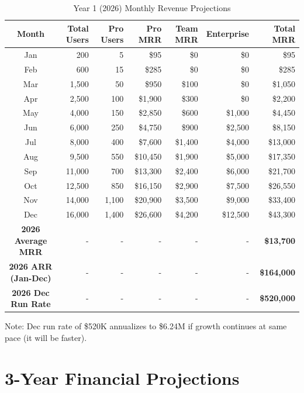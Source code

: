\documentclass{report}
\begin{document}
\begin{table}[h]
\centering
\begin{tabular}{|c|r|r|r|r|r|r|}
\toprule
\textbf{Month} & \textbf{Total Users} & \textbf{Pro Users} & \textbf{Pro MRR} & \textbf{Team MRR} & \textbf{Enterprise} & \textbf{Total MRR} \\
\midrule
Jan & 200 & 5 & \$95 & \$0 & \$0 & \$95 \\
Feb & 600 & 15 & \$285 & \$0 & \$0 & \$285 \\
Mar & 1,500 & 50 & \$950 & \$100 & \$0 & \$1,050 \\
Apr & 2,500 & 100 & \$1,900 & \$300 & \$0 & \$2,200 \\
May & 4,000 & 150 & \$2,850 & \$600 & \$1,000 & \$4,450 \\
Jun & 6,000 & 250 & \$4,750 & \$900 & \$2,500 & \$8,150 \\
Jul & 8,000 & 400 & \$7,600 & \$1,400 & \$4,000 & \$13,000 \\
Aug & 9,500 & 550 & \$10,450 & \$1,900 & \$5,000 & \$17,350 \\
Sep & 11,000 & 700 & \$13,300 & \$2,400 & \$6,000 & \$21,700 \\
Oct & 12,500 & 850 & \$16,150 & \$2,900 & \$7,500 & \$26,550 \\
Nov & 14,000 & 1,100 & \$20,900 & \$3,500 & \$9,000 & \$33,400 \\
Dec & 16,000 & 1,400 & \$26,600 & \$4,200 & \$12,500 & \$43,300 \\
\midrule
\textbf{2026 Average MRR} & - & - & - & - & - & \textbf{\$13,700} \\
\textbf{2026 ARR (Jan-Dec)} & - & - & - & - & - & \textbf{\$164,000} \\
\textbf{2026 Dec Run Rate} & - & - & - & - & - & \textbf{\$520,000} \\
\bottomrule
\end{tabular}
\caption{Year 1 (2026) Monthly Revenue Projections}
\end{table}

Note: Dec run rate of \$520K annualizes to \$6.24M if growth continues at same pace (it will be faster).

\section{3-Year Financial Projections}
\end{document}
